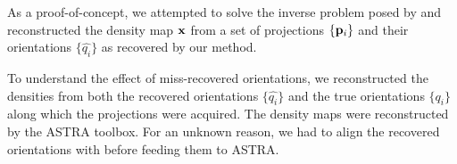 As a proof-of-concept, we attempted to solve the inverse problem posed by  and reconstructed the density map $\mathbf{x}$ from a set of projections $\{ \mathbf{p}_i \}$ and their orientations $\{ \widehat{q_i} \}$ as recovered by our method.


To understand the effect of miss-recovered orientations, we reconstructed the densities from both the recovered orientations $\{ \widehat{q_i} \}$ and the true orientations $\{ q_i \}$ along which the projections were acquired.
The density maps were reconstructed by the ASTRA toolbox.
For an unknown reason, we had to align the recovered orientations with  before feeding them to ASTRA.

